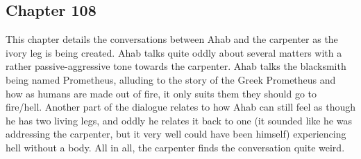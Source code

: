 \subsection{Chapter 108}

This chapter details the conversations between Ahab and the carpenter as the
ivory leg is being created. Ahab talks quite oddly about several matters with a
rather passive-aggressive tone towards the carpenter. Ahab talks the blacksmith
being named Prometheus, alluding to the story of the Greek Prometheus and how
as humans are made out of fire, it only suits them they should go to fire/hell.
Another part of the dialogue relates to how Ahab can still feel as though he
has two living legs, and oddly he relates it back to one (it sounded like he
was addressing the carpenter, but it very well could have been himself)
experiencing hell without a body. All in all, the carpenter finds the
conversation quite weird.
